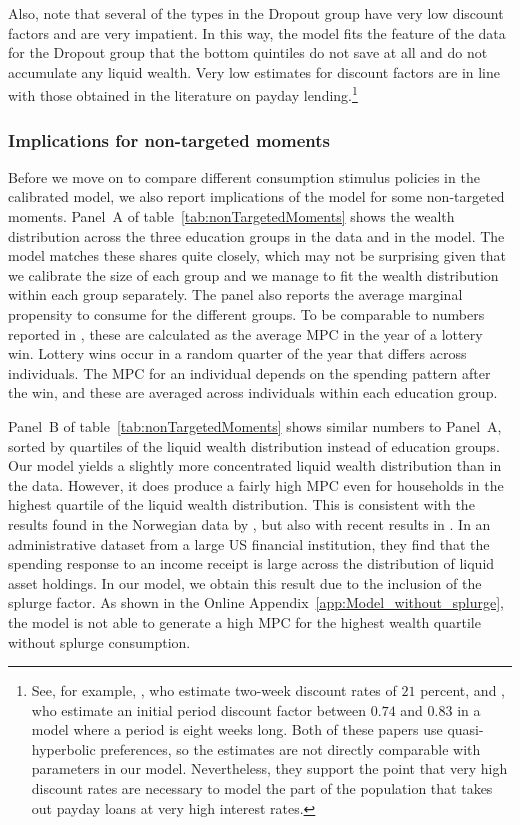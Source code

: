 \documentclass[\econtexRoot/HAFiscal]{subfiles}
\begin{document}
Also, note that several of the types in the Dropout group have very low discount factors and are very impatient.
In this way, the model fits the feature of the data for the Dropout group that the bottom quintiles do not save at all and do not accumulate any liquid wealth.
Very low estimates for discount factors are in line with those obtained in the literature on payday lending.\footnote{See, for example, \cite{skiba2008payday}, who estimate two-week discount rates of $21$ percent, and \cite{allcott2021high}, who estimate an initial period discount factor between $0.74$ and $0.83$ in a model where a period is eight weeks long.
Both of these papers use quasi-hyperbolic preferences, so the estimates are not directly comparable with parameters in our model.
Nevertheless, they support the point that very high discount rates are necessary to model the part of the population that takes out payday loans at very high interest rates.} 

\hypertarget{non-targeted-moments}{}\par\subsubsection{Implications for non-targeted moments} 
\notinsubfile{\label{sec:nonTargetedMoments}}

Before we move on to compare different consumption stimulus policies in the calibrated model, we also report implications of the model for some non-targeted moments.
Panel~A of table~\ref{tab:nonTargetedMoments} shows the wealth distribution across the three education groups in the data and in the model.
The model matches these shares quite closely, which may not be surprising given that we calibrate the size of each group and we manage to fit the wealth distribution within each group separately.
The panel also reports the average marginal propensity to consume for the different groups.
To be comparable to numbers reported in \citet{fagereng_mpc_2021}, these are calculated as the average MPC in the year of a lottery win.
Lottery wins occur in a random quarter of the year that differs across individuals.
The MPC for an individual depends on the spending pattern after the win, and these are averaged across individuals within each education group.


Panel~B of table~\ref{tab:nonTargetedMoments} shows similar numbers to Panel~A, sorted by quartiles of the liquid wealth distribution instead of education groups.
Our model yields a slightly more concentrated liquid wealth distribution than in the data.
However, it does produce a fairly high MPC even for households in the highest quartile of the liquid wealth distribution.
This is consistent with the results found in the Norwegian data by \citet{fagereng_mpc_2021}, but also with recent results in \citet{graham2024mental}.
In an administrative dataset from a large US financial institution, they find that the spending response to an income receipt is large across the distribution of liquid asset holdings.
In our model, we obtain this result due to the inclusion of the splurge factor.
As shown in the Online Appendix~\ref{app:Model_without_splurge}, the model is not able to generate a high MPC for the highest wealth quartile without splurge consumption.
\end{document}
